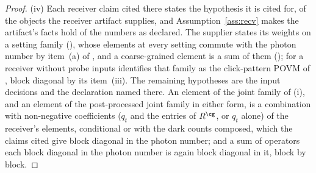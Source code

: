 \begin{proof}
(iv) Each receiver claim cited there states the hypothesis it is cited for,
of the objects the receiver artifact supplies, and
Assumption~\ref{ass:recv} makes the artifact's facts hold of the numbers as
declared. The supplier states its weights on a setting family
(), whose elements at every setting commute
with the photon number by item~(a) of ,
and a coarse-grained element is a sum of them
(); for a receiver without probe inputs
 identifies that family as the
click-pattern POVM of , block diagonal by its
item~(iii). The remaining hypotheses are the input decisions and the
declaration named there. An element of the joint family of (i), and an
element of the post-processed joint family in either form, is a combination
with non-negative coefficients ($q_t$ and the entries of $R^{\cg}$, or $q_t$
alone) of the receiver's elements, conditional or with the dark counts
composed, which the claims cited give block diagonal in the photon number;
and a sum of operators each block diagonal in the photon number is again
block diagonal in it, block by block.
\end{proof}
